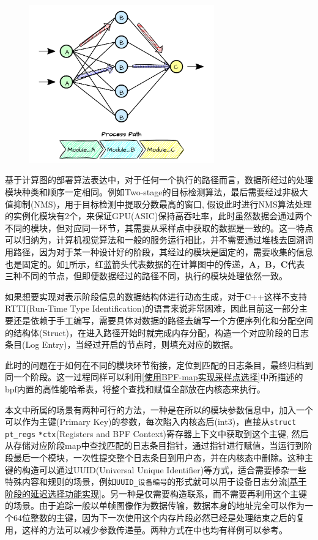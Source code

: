 \documentclass[master,anonymous]{shtthesis}
\begin{document}
\begin{figure}[htbp]
	\centering
	\includegraphics[width=8cm]{img/path.pdf}
	\label{rbpath}
\end{figure}


基于计算图的部署算法表达中，对于任何一个执行的路径而言，数据所经过的处理模块种类和顺序一定相同。例如Two-stage的目标检测算法\cite{burke2017meta}，最后需要经过非极大值抑制(NMS)，用于目标检测中提取分数最高的窗口, 假设此时进行NMS算法处理的实例化模块有2个，来保证GPU(ASIC)保持高吞吐率，此时虽然数据会通过两个不同的模块，但对应同一环节，其需要从采样点中获取的数据是一致的。这一特点可以归纳为，计算机视觉算法和一般的服务运行相比，并不需要通过堆栈去回溯调用路径，因为对于某一种设计好的阶段，其经过的模块是固定的，需要收集的信息也是固定的。如\ref{rbpath}所示，红蓝箭头代表数据的在计算图中的传递，\textbf{A}，\textbf{B}，\textbf{C}代表三种不同的节点，但即便数据经过的路径不同，执行的模块处理依然一致。

如果想要实现对表示阶段信息的数据结构体进行动态生成，对于C++这样不支持RTTI(Run-Time Type Identification)的语言来说非常困难，因此目前这一部分主要还是依赖于手工编写，需要具体对数据的路径去编写一个方便序列化和分配空间的结构体(Struct)，在进入路径开始时就完成内存分配，构造一个对应阶段的日志条目(Log Entry)，当经过开启的节点时，则填充对应的数据。

此时的问题在于如何在不同的模块环节衔接，定位到匹配的日志条目，最终归档到同一个阶段。这一过程同样可以利用\ref{使用BPF-map实现采样点选择}中所描述的bpf内置的高性能哈希表，将整个查找和赋值全部放在内核态来执行。

本文中所属的场景有两种可行的方法，一种是在所以的模块参数信息中，加入一个可以作为主键(Primary Key)的参数，每次陷入内核态后(int3)，直接从\verb*|struct| \verb*|pt_regs| \verb*|*ctx|(Registers and BPF Context)寄存器上下文中获取到这个主键, 然后从存储对应阶段map中查找匹配的日志条目指针，通过指针进行赋值，当运行到阶段最后一个模块，一次性提交整个日志条目到用户态，并在内核态中删除。这种主键的构造可以通过UUID(Universal Unique Identifier)等方式，适合需要掺杂一些特殊内容和规则的场景，例如\verb*|UUID_设备编号|的形式就可以用于设备日志分流\ref{基于阶段的延迟选择功能实现}。另一种是仅需要构造联系，而不需要再利用这个主键的场景。由于追踪一般以单帧图像作为数据传输，数据本身的地址完全可以作为一个64位整数的主键，因为下一次使用这个内存片段必然已经是处理结束之后的复用，这样的方法可以减少参数传递量。两种方式在\cite{stortrace}中也均有样例可以参考。
\end{document}
